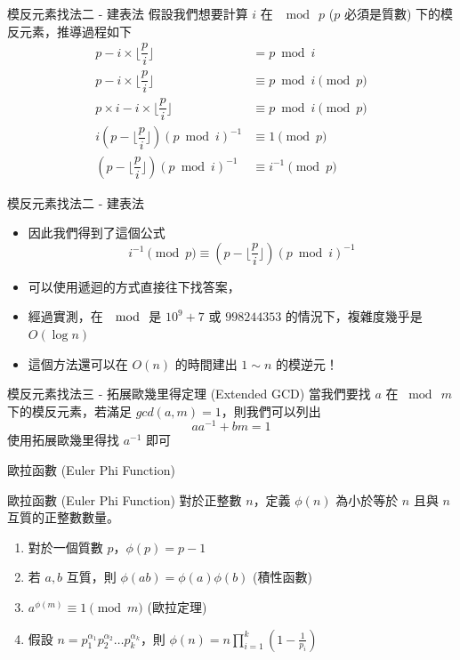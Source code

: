 \documentclass[aspectratio=169]{beamer}
\begin{document}
    \begin{frame}{模反元素找法二 - 建表法}
        假設我們想要計算 $i$ 在 $\mod \ p$ ($p$ 必須是質數) 下的模反元素，推導過程如下
        \begin{align*}
            p - i \times \Big \lfloor \dfrac{p}{i} \Big \rfloor&= p \bmod i \\
            p - i \times \Big \lfloor \dfrac{p}{i} \Big \rfloor &\equiv p \bmod i \pmod p \\
            p \times i - i \times \Big \lfloor \dfrac{p}{i} \Big \rfloor &\equiv p \bmod i \pmod p \\
            i(p - \Big \lfloor \dfrac{p}{i} \Big \rfloor)(p \bmod i)^{-1} &\equiv 1 \pmod p \\
            (p - \Big \lfloor \dfrac{p}{i} \Big \rfloor)(p \bmod i)^{-1} &\equiv i^{-1} \pmod p 
        \end{align*}
    \end{frame}
    
    \begin{frame}{模反元素找法二 - 建表法}
        \begin{itemize}
            \item 因此我們得到了這個公式
            $$i^{-1} \pmod p \equiv (p - \Big \lfloor \dfrac{p}{i} \Big \rfloor)(p \bmod i)^{-1}$$
            \item<2-> 可以使用遞迴的方式直接往下找答案，
            \item<2-> 經過實測，在 $\mod$ 是 $10^9+7$ 或 $998244353$ 的情況下，複雜度幾乎是 $O(\log n)$
            \item<3-> 這個方法還可以在 $O(n)$ 的時間建出 $1 \sim n$ 的模逆元！ 
        \end{itemize}
    \end{frame}
    
    \begin{frame}{模反元素找法三 - 拓展歐幾里得定理 (Extended GCD)}
        當我們要找 $a$ 在 $\bmod \ m$ 下的模反元素，若滿足 $gcd(a,m)=1$，則我們可以列出
        $$aa^{-1} + bm = 1$$
        使用拓展歐幾里得找 $a^{-1}$ 即可
    \end{frame}
    
    \begin{frame}{歐拉函數 (Euler Phi Function)}
        \begin{block}{歐拉函數 (Euler Phi Function)}
            對於正整數 $n$，定義 $\phi(n)$ 為小於等於 $n$ 且與 $n$ 互質的正整數數量。
            \begin{enumerate}
                \item 對於一個質數 $p$，$\phi(p) = p-1$
                \item 若 $a,b$ 互質，則 $\phi(ab) = \phi(a) \phi(b)$ (積性函數)
                \item $a^{\phi(m)} \equiv 1 \pmod m$ (歐拉定理)
                \item 假設 $n=p_1^{\alpha_1}p_2^{\alpha_2}\dots p_k^{\alpha_k}$，則 $\phi(n) = n \prod_{i=1}^k (1-\frac{1}{p_i})$
            \end{enumerate}
        \end{block}
    \end{frame}
    
\end{document}
